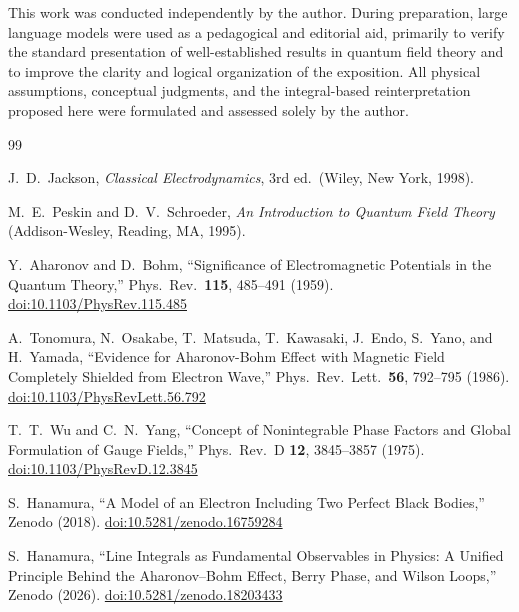 \documentclass[%
 reprint, amsmath,amssymb, aps, prb, ]{revtex4-2}
\numberwithin{equation}{section}
\begin{document}
\begin{acknowledgments}
This work was conducted independently by the author. During preparation, large language models were used as a pedagogical and editorial aid, primarily to verify the standard presentation of well-established results in quantum field theory and to improve the clarity and logical organization of the exposition. All physical assumptions, conceptual judgments, and the integral-based reinterpretation proposed here were formulated and assessed solely by the author.
\end{acknowledgments}


\begin{thebibliography}{99}


J.~D.~Jackson, \textit{Classical Electrodynamics}, 3rd ed.\ (Wiley, New York, 1998).

M.~E.~Peskin and D.~V.~Schroeder, \textit{An Introduction to Quantum Field Theory} (Addison-Wesley, Reading, MA, 1995).

Y.~Aharonov and D.~Bohm, ``Significance of Electromagnetic Potentials in the Quantum Theory,'' Phys.\ Rev.\ \textbf{115}, 485--491 (1959). \href{https://doi.org/10.1103/PhysRev.115.485}{doi:10.1103/PhysRev.115.485}

A.~Tonomura, N.~Osakabe, T.~Matsuda, T.~Kawasaki, J.~Endo, S.~Yano, and H.~Yamada, ``Evidence for Aharonov-Bohm Effect with Magnetic Field Completely Shielded from Electron Wave,'' Phys.\ Rev.\ Lett.\ \textbf{56}, 792--795 (1986). \href{https://doi.org/10.1103/PhysRevLett.56.792}{doi:10.1103/PhysRevLett.56.792}

T.~T.~Wu and C.~N.~Yang, ``Concept of Nonintegrable Phase Factors and Global Formulation of Gauge Fields,'' Phys.\ Rev.\ D \textbf{12}, 3845--3857 (1975). \href{https://doi.org/10.1103/PhysRevD.12.3845}{doi:10.1103/PhysRevD.12.3845}

S.~Hanamura, ``A Model of an Electron Including Two Perfect Black Bodies,'' Zenodo (2018). \href{https://doi.org/10.5281/zenodo.16759284}{doi:10.5281/zenodo.16759284}

S.~Hanamura, ``Line Integrals as Fundamental Observables in Physics: A Unified Principle Behind the Aharonov--Bohm Effect, Berry Phase, and Wilson Loops,'' Zenodo (2026). \href{https://doi.org/10.5281/zenodo.18203433}{doi:10.5281/zenodo.18203433}


\end{thebibliography}
\end{document}
